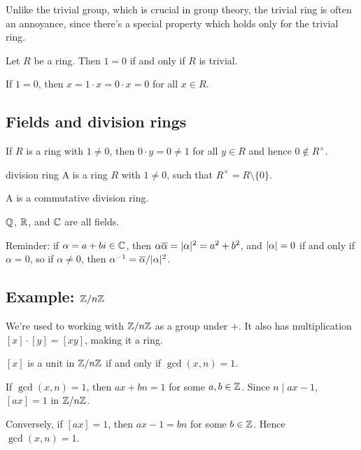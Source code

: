 \documentclass[12pt,letterpaper]{report}
\begin{document}
Unlike the trivial group, which is crucial in group theory, the trivial ring is often an annoyance,
since there's a special property which holds only for the trivial ring.

\begin{lem}{}{}
  Let $R$ be a ring.
  Then $1 = 0$ if and only if $R$ is trivial.
\end{lem}

\begin{thmproof}
  If $1 = 0$, then $x = 1 \cdot x = 0 \cdot x = 0$ for all $x \in R$.
\end{thmproof}

\pagebreak
\subsection{Fields and division rings}

If $R$ is a ring with $1 \neq 0$, then $0 \cdot y = 0 \neq 1$ for all $y \in R$ and hence
$0 \not\in R^\times$.

\begin{defn}{division ring}{}
  A  is a ring $R$ with $1 \neq 0$, such that $R^\times = R \setminus \{0\}$.

  A  is a commutative division ring.
\end{defn}

\begin{ex}
  $\mathbb{Q}$, $\mathbb{R}$, and $\mathbb{C}$ are all fields.
\end{ex}

Reminder: if $\alpha = a + bi \in \mathbb{C}$, then
$\alpha\overline{\alpha} = \lvert\alpha\rvert^2 = a^2 + b^2$, and $\lvert\alpha\rvert = 0$ if and only if
$\alpha = 0$, so if $\alpha \neq 0$, then $\alpha^{-1} = \overline{\alpha}/\lvert\alpha\rvert^2$.

\pagebreak
\subsection[Example: Z/nZ]{Example: $\mathbb{Z}/{n}\mathbb{Z}$}

We're used to working with $\mathbb{Z}/{n}\mathbb{Z}$ as a group under $+$.
It also has multiplication $[x] \cdot [y] = [xy]$, making it a ring.

\begin{lem}{}{}
  $[x]$ is a unit in $\mathbb{Z}/{n}\mathbb{Z}$ if and only if $\gcd(x, n) = 1$.
\end{lem}

\begin{thmproof}
  If $\gcd(x, n) = 1$, then $ax + bn = 1$ for some $a, b \in \mathbb{Z}$.
  Since $n \mid ax - 1$, $[ax] = 1$ in $\mathbb{Z}/{n}\mathbb{Z}$.

  Conversely, if $[ax] = 1$, then $ax - 1 = bn$ for some $b \in \mathbb{Z}$.
  Hence $\gcd(x, n) = 1$.
\end{thmproof}
\end{document}
